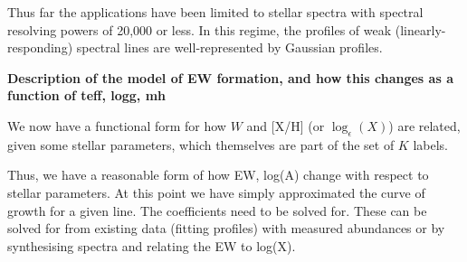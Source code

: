 \documentclass[useAMS,usenatbib]{mn2e}
\newcommand\tc{\textit{The Cannon}}
\begin{document}



%






Thus far the applications
have been limited to stellar spectra with spectral resolving powers of 20,000
or less. In this regime, the profiles of weak (linearly-responding) spectral lines
are well-represented by Gaussian profiles.



\textbf{Description of the model of EW formation, and how this changes as a function of teff, logg, mh}


We now have a functional form for how $W$ and [X/H] (or $\log_{\epsilon}(X)$) are related, given some stellar parameters, which themselves are part of the set of $K$ labels. 


Thus, we have a reasonable form of how EW, log(A) change with respect to
stellar parameters. At this point we have simply approximated the curve of growth
for a given line. The coefficients need to be solved for. These can be solved for
from existing data (fitting profiles) with measured abundances or by synthesising
spectra and relating the EW to log(X).
\end{document}
